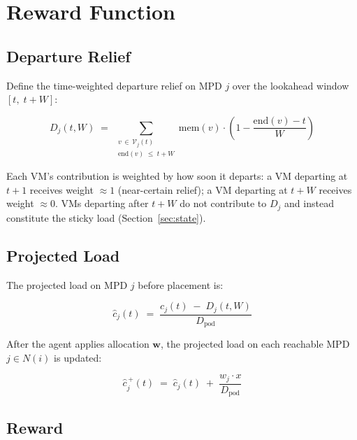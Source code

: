 \documentclass[11pt]{article}
\begin{document}
\section{Reward Function}

\subsection{Departure Relief}

Define the time-weighted departure relief on MPD $j$ over the
lookahead window $[t,\; t{+}W]$:

\begin{equation}
    D_j(t, W)
    \;=\;
    \sum_{\substack{v \,\in\, \mathcal{V}_j(t) \\
                    \mathrm{end}(v) \;\leq\; t + W}}
    \mathrm{mem}(v)
    \cdot
    \left(1 - \frac{\mathrm{end}(v) - t}{W}\right)
    \label{eq:departure}
\end{equation}

Each VM's contribution is weighted by how soon it departs: a VM
departing at $t{+}1$ receives weight $\approx 1$ (near-certain
relief); a VM departing at $t{+}W$ receives weight $\approx 0$.
VMs departing after $t{+}W$ do not contribute to $D_j$ and
instead constitute the sticky load (Section~\ref{sec:state}).

\subsection{Projected Load}

The projected load on MPD $j$ before placement is:

\begin{equation}
    \hat{c}_j(t)
    \;=\;
    \frac{c_j(t) \;-\; D_j(t, W)}{D_\mathrm{pod}}
    \label{eq:chat}
\end{equation}

After the agent applies allocation $\mathbf{w}$, the projected load
on each reachable MPD $j \in N(i)$ is updated:

\begin{equation}
    \hat{c}_j^{\,+}(t)
    \;=\;
    \hat{c}_j(t)
    \;+\;
    \frac{w_j \cdot x}{D_\mathrm{pod}}
    \label{eq:chat-post}
\end{equation}

\subsection{Reward}
\end{document}
